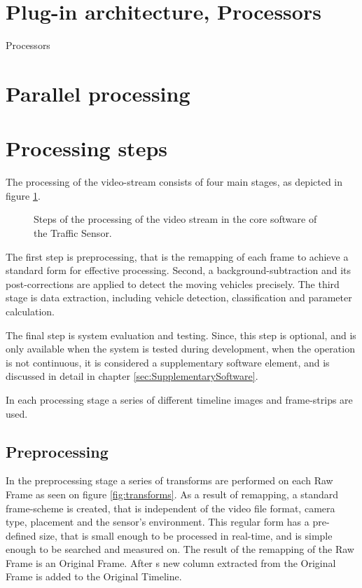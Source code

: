 \section{Plug-in architecture, Processors}
Processors

\section{Parallel processing}
\section{Processing steps}
The processing of the video-stream consists of four main stages, as depicted in figure \ref{fig:processing_steps}.

\begin{figure}[bh]
	\centering
	
	\caption{Steps of the processing of the video stream in the core software of the Traffic Sensor.\label{fig:processing_steps}}
\end{figure}

The first step is preprocessing, that is the remapping of each frame to achieve a standard form for effective processing.
Second, a background-subtraction and its post-corrections are applied to detect the moving vehicles precisely.
The third stage is data extraction, including vehicle detection, classification and parameter calculation.

The final step is system evaluation and testing. 
Since, this step is optional, and is only available when the system is tested during development, when the operation is not continuous, it is considered a supplementary software element, and is discussed in detail in chapter \ref{sec:SupplementarySoftware}.

In each processing stage a series of different timeline images and frame-strips are used.
\subsection{Preprocessing}
In the preprocessing stage a series of transforms are performed on each Raw Frame as seen on figure \ref{fig:transforms}.
As a result of remapping, a standard frame-scheme is created, that is independent of the video file format, camera type, placement and the sensor's environment.
This regular form has a pre-defined size, that is small enough to be processed in real-time, and is simple enough to be searched and measured on.
The result of the remapping of the Raw Frame is an Original Frame.
After s new column extracted from the Original Frame is added to the Original Timeline.

